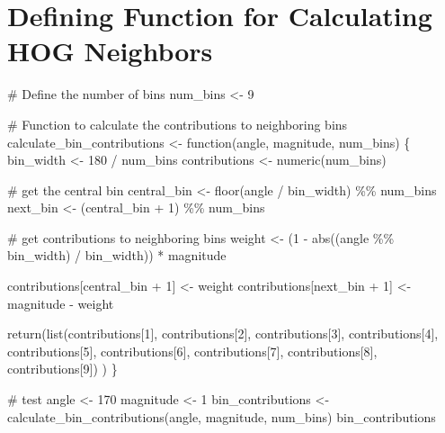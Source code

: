 \documentclass[
  letterpaper,
  DIV=11,
  numbers=noendperiod]{scrreprt}
\newenvironment{Shaded}{\begin{snugshade}}{\end{snugshade}}
\newcommand{\CommentTok}[1]{\textcolor[rgb]{0.37,0.37,0.37}{#1}}
\newcommand{\ControlFlowTok}[1]{\textcolor[rgb]{0.00,0.23,0.31}{#1}}
\newcommand{\DecValTok}[1]{\textcolor[rgb]{0.68,0.00,0.00}{#1}}
\newcommand{\FunctionTok}[1]{\textcolor[rgb]{0.28,0.35,0.67}{#1}}
\newcommand{\NormalTok}[1]{\textcolor[rgb]{0.00,0.23,0.31}{#1}}
\newcommand{\OtherTok}[1]{\textcolor[rgb]{0.00,0.23,0.31}{#1}}
\newcommand{\SpecialCharTok}[1]{\textcolor[rgb]{0.37,0.37,0.37}{#1}}
\begin{document}
\hypertarget{defining-function-for-calculating-hog-neighbors}{%
\section{Defining Function for Calculating HOG
Neighbors}\label{defining-function-for-calculating-hog-neighbors}}

\begin{Shaded}
\begin{Highlighting}[]
\CommentTok{\# Define the number of bins}
\NormalTok{num\_bins }\OtherTok{\textless{}{-}} \DecValTok{9}

\CommentTok{\# Function to calculate the contributions to neighboring bins}
\NormalTok{calculate\_bin\_contributions }\OtherTok{\textless{}{-}} \ControlFlowTok{function}\NormalTok{(angle, magnitude, num\_bins) \{}
\NormalTok{  bin\_width }\OtherTok{\textless{}{-}} \DecValTok{180} \SpecialCharTok{/}\NormalTok{ num\_bins}
\NormalTok{  contributions }\OtherTok{\textless{}{-}} \FunctionTok{numeric}\NormalTok{(num\_bins)}
  
  \CommentTok{\# get the central bin}
\NormalTok{  central\_bin }\OtherTok{\textless{}{-}} \FunctionTok{floor}\NormalTok{(angle }\SpecialCharTok{/}\NormalTok{ bin\_width) }\SpecialCharTok{\%\%}\NormalTok{ num\_bins}
\NormalTok{  next\_bin }\OtherTok{\textless{}{-}}\NormalTok{ (central\_bin }\SpecialCharTok{+} \DecValTok{1}\NormalTok{) }\SpecialCharTok{\%\%}\NormalTok{ num\_bins}
  
  \CommentTok{\# get contributions to neighboring bins}
\NormalTok{  weight }\OtherTok{\textless{}{-}}\NormalTok{ (}\DecValTok{1} \SpecialCharTok{{-}} \FunctionTok{abs}\NormalTok{((angle }\SpecialCharTok{\%\%}\NormalTok{ bin\_width) }\SpecialCharTok{/}\NormalTok{ bin\_width)) }\SpecialCharTok{*}\NormalTok{ magnitude}
  
\NormalTok{  contributions[central\_bin }\SpecialCharTok{+} \DecValTok{1}\NormalTok{] }\OtherTok{\textless{}{-}}\NormalTok{ weight}
\NormalTok{  contributions[next\_bin }\SpecialCharTok{+} \DecValTok{1}\NormalTok{] }\OtherTok{\textless{}{-}}\NormalTok{ magnitude }\SpecialCharTok{{-}}\NormalTok{ weight}
  
  \FunctionTok{return}\NormalTok{(}\FunctionTok{list}\NormalTok{(contributions[}\DecValTok{1}\NormalTok{],}
\NormalTok{         contributions[}\DecValTok{2}\NormalTok{],}
\NormalTok{         contributions[}\DecValTok{3}\NormalTok{],}
\NormalTok{         contributions[}\DecValTok{4}\NormalTok{],}
\NormalTok{         contributions[}\DecValTok{5}\NormalTok{],}
\NormalTok{         contributions[}\DecValTok{6}\NormalTok{],}
\NormalTok{         contributions[}\DecValTok{7}\NormalTok{],}
\NormalTok{         contributions[}\DecValTok{8}\NormalTok{],}
\NormalTok{         contributions[}\DecValTok{9}\NormalTok{])}
\NormalTok{         )}
\NormalTok{\}}


\CommentTok{\# test}
\NormalTok{angle }\OtherTok{\textless{}{-}} \DecValTok{170}
\NormalTok{magnitude }\OtherTok{\textless{}{-}} \DecValTok{1}
\NormalTok{bin\_contributions }\OtherTok{\textless{}{-}} \FunctionTok{calculate\_bin\_contributions}\NormalTok{(angle, magnitude, num\_bins)}
\NormalTok{bin\_contributions}
\end{Highlighting}
\end{Shaded}
\end{document}
